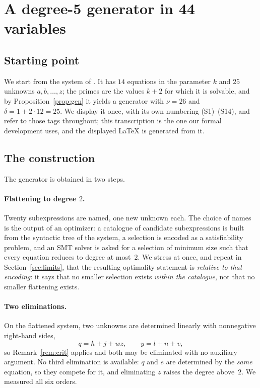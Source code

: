 \section{A degree-5 generator in 44 variables}
\label{sec:deg5}

\subsection{Starting point}

We start from the system of \cite{jsww1976}. It has $14$ equations in the
parameter $k$ and $25$ unknowns $a,b,\dots,z$; the primes are the values $k+2$
for which it is solvable, and by Proposition~\ref{prop:gen} it yields a
generator with $\nu=26$ and $\delta=1+2\cdot 12=25$. We display it once, with
its own numbering \textup{(S1)--(S14)}, and refer to those tags throughout;
this transcription is the one our formal development uses, and the displayed
\LaTeX{} is generated from it.
\label{ssec:sistema1}


\subsection{The construction}

The generator is obtained in two steps.

\paragraph{Flattening to degree $2$.}
Twenty subexpressions are named, one new unknown each. The choice of names is
the output of an optimizer: a catalogue of candidate subexpressions is built
from the syntactic tree of the system, a selection is encoded as a
satisfiability problem, and an SMT solver is asked for a selection of minimum
size such that every equation reduces to degree at most~$2$. We stress at once,
and repeat in Section~\ref{sec:limits}, that the resulting optimality statement
is \emph{relative to that encoding}: it says that no smaller selection exists
\emph{within the catalogue}, not that no smaller flattening exists.

\paragraph{Two eliminations.}
On the flattened system, two unknowns are determined linearly with nonnegative
right-hand sides,
\[
  q = h+j+wz, \qquad y = l+n+v ,
\]
so Remark~\ref{rem:crit} applies and both may be eliminated with no auxiliary
argument. No third elimination is available: $q$ and $e$ are determined by the
\emph{same} equation, so they compete for it, and eliminating $z$ raises the
degree above~$2$. We measured all six orders.

